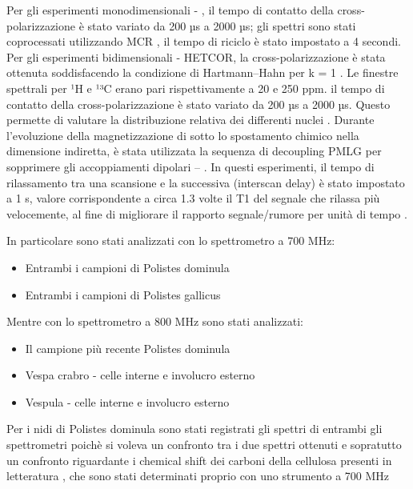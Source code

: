 Per gli esperimenti monodimensionali  - , il tempo di contatto della cross-polarizzazione è stato variato da 200 µs a 2000 µs; gli spettri sono stati coprocessati utilizzando MCR \cite{Bruno2020MCR2DNMR}, il tempo di riciclo è stato impostato a 4 secondi\cite{LARSSON199719}. %
Per gli esperimenti bidimensionali  -  HETCOR, la cross-polarizzazione è stata ottenuta soddisfacendo la condizione di Hartmann–Hahn per k = 1 \cite{MARKS1996157}.
Le finestre spettrali per ¹H e ¹³C erano pari rispettivamente a 20 e 250 ppm. 
il tempo di contatto della cross-polarizzazione è stato variato da 200 µs a 2000 µs. Questo permette di valutare la distribuzione relativa dei differenti nuclei \cite{Duan2020SpinDiffusion}.
Durante l’evoluzione della magnetizzazione di  sotto lo spostamento chimico nella dimensione indiretta, è stata utilizzata la sequenza di decoupling PMLG per sopprimere gli accoppiamenti dipolari  –  \cite{VINOGRADOV2002193}.
In questi esperimenti, il tempo di rilassamento tra una scansione e la successiva (interscan delay) è stato impostato a 1 s, valore corrispondente a circa 1.3 volte il T1 del segnale che rilassa più velocemente, al fine di migliorare il rapporto segnale/rumore per unità di tempo \cite{PONS1988314}. %

In particolare sono stati analizzati con lo spettrometro a 700 MHz:
\begin{itemize}
    \item Entrambi i campioni di Polistes dominula 
    \item Entrambi i campioni di Polistes gallicus 
\end{itemize}
Mentre con lo spettrometro a 800 MHz sono stati analizzati:
\begin{itemize}
    \item Il campione più recente Polistes dominula
    \item Vespa crabro - celle interne e involucro esterno
    \item Vespula - celle interne e involucro esterno
\end{itemize}
Per i nidi di Polistes dominula sono stati registrati gli spettri di entrambi gli spettrometri poichè si voleva un confronto tra i due spettri ottenuti e sopratutto un confronto riguardante i chemical shift dei carboni della cellulosa presenti in letteratura \cite{LARSSON199719}, che sono stati determinati proprio con uno strumento a 700 MHz


